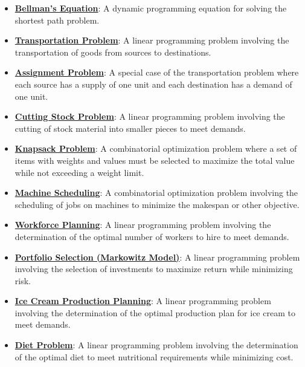 \documentclass{article}%
\begin{document}
\begin{itemize}[leftmargin=*]
\item \href{https://www.math.purdue.edu/~yipn/421/2024-12-03-Duality.pdf#page=1}{\textbf{Bellman's Equation}}: A dynamic programming equation for solving the shortest path problem. %
\item \href{https://www.math.purdue.edu/~yipn/421/2024-12-03-Duality.pdf#page=1}{\textbf{Transportation Problem}}: A linear programming problem involving the transportation of goods from sources to destinations. %
\item \href{https://www.math.purdue.edu/~yipn/421/2024-12-03-Duality.pdf#page=1}{\textbf{Assignment Problem}}: A special case of the transportation problem where each source has a supply of one unit and each destination has a demand of one unit. %
\item \href{https://www.math.purdue.edu/~yipn/421/2024-12-03-Duality.pdf#page=1}{\textbf{Cutting Stock Problem}}: A linear programming problem involving the cutting of stock material into smaller pieces to meet demands. %
\item \href{https://www.math.purdue.edu/~yipn/421/2024-12-03-Duality.pdf#page=1}{\textbf{Knapsack Problem}}: A combinatorial optimization problem where a set of items with weights and values must be selected to maximize the total value while not exceeding a weight limit. %
\item \href{https://www.math.purdue.edu/~yipn/421/2024-12-03-Duality.pdf#page=1}{\textbf{Machine Scheduling}}: A combinatorial optimization problem involving the scheduling of jobs on machines to minimize the makespan or other objective. %
\item \href{https://www.math.purdue.edu/~yipn/421/2024-12-03-Duality.pdf#page=1}{\textbf{Workforce Planning}}: A linear programming problem involving the determination of the optimal number of workers to hire to meet demands. %
\item \href{https://www.math.purdue.edu/~yipn/421/2024-12-03-Duality.pdf#page=1}{\textbf{Portfolio Selection (Markowitz Model)}}: A linear programming problem involving the selection of investments to maximize return while minimizing risk. %
\item \href{https://www.math.purdue.edu/~yipn/421/2024-12-03-Duality.pdf#page=1}{\textbf{Ice Cream Production Planning}}: A linear programming problem involving the determination of the optimal production plan for ice cream to meet demands. %
\item \href{https://www.math.purdue.edu/~yipn/421/2024-12-03-Duality.pdf#page=1}{\textbf{Diet Problem}}: A linear programming problem involving the determination of the optimal diet to meet nutritional requirements while minimizing cost. %

\end{itemize}
\end{document}
